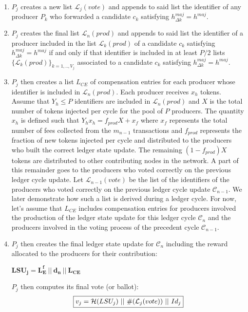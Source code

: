 \begin{enumerate}
\item $P_j$ creates a new list $\mathcal{L}_j(vote)$ and appends to said list the identifier of any producer $P_k$ who forwarded a candidate $c_k$ satisfying $h^{maj}_{\Delta k} = h^{maj}$.
\item $P_j$ creates the final list $\mathcal{L}_n(prod)$ and appends to said list  the identifier of a producer included in the list $\mathcal{L}_k(prod)$ of a candidate $c_k$ satisfying $h^{maj}_{\Delta k} = h^{maj}$ if and only if that identifier is included in at least $P/2$ lists $\{\mathcal{L}_{k}(prod)\}_{k=1,..,V_j}$ associated to a candidate $c_{k}$ satisfying $h^{maj}_{\Delta k} = h^{maj}$. 
\item $P_j$ then creates a list $L_{CE}$ of compensation entries for each producer whose identifier is included in $\mathcal{L}_n(prod)$. Each producer receives $x_h$ tokens. Assume that $Y_h \leq P$ identifiers are included in $\mathcal{L}_n(prod)$ and $X$ is the total number of tokens injected per cycle for the pool of $P$ producers. The quantity $x_h$ is defined such that $Y_hx_h = f_{prod}X + x_f$ where $x_f$ represents the total number of fees collected from the $m_{n-1}$ transactions and $f_{prod}$ represents the fraction of new tokens injected per cycle and distributed to the producers who built the correct ledger state update. The remaining $(1-f_{prod})X$ tokens are distributed to other contributing nodes in the network. A part of this remainder goes to the producers who voted correctly on the previous ledger cycle update. Let $\mathcal{L}_{n-1}(vote)$ be the list of the identifiers of the producers who voted correctly on the previous ledger cycle update $\mathcal{C}_{n-1}$. We later demonstrate how such a list is derived during a ledger cycle. For now, let's assume that $L_{CE}$ includes compensation entries for producers involved the production of the ledger state update for this ledger cycle $\mathcal{C}_n$ and the producers involved in the voting process of the precedent cycle $\mathcal{C}_{n-1}$. 
\item $P_j$ then creates the final ledger state update for $\mathcal{C}_n$  including the reward allocated to the producers for their contribution:
\begin{center}
$\mathbf{LSU_j = L^f_E~||~d_n~||~L_{CE}}$
\end{center}
$P_j$ then computes its final vote (or ballot):
\begin{equation}
\label{eq:vj}
\fbox{$v_j = \mathcal{H}(LSU_j)~||~\#(\mathcal{L}_j(vote))~||~Id_j$}
\end{equation}


\end{enumerate}
